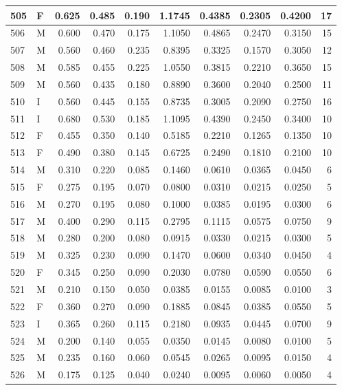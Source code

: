 \documentclass[9pt,twocolumn,twoside,]{pnas-new}
\begin{document}
\begin{tabular}{l|l|r|r|r|r|r|r|r|r}
\hline
505 & F & 0.625 & 0.485 & 0.190 & 1.1745 & 0.4385 & 0.2305 & 0.4200 & 17\\
\hline
506 & M & 0.600 & 0.470 & 0.175 & 1.1050 & 0.4865 & 0.2470 & 0.3150 & 15\\
\hline
507 & M & 0.560 & 0.460 & 0.235 & 0.8395 & 0.3325 & 0.1570 & 0.3050 & 12\\
\hline
508 & M & 0.585 & 0.455 & 0.225 & 1.0550 & 0.3815 & 0.2210 & 0.3650 & 15\\
\hline
509 & M & 0.560 & 0.435 & 0.180 & 0.8890 & 0.3600 & 0.2040 & 0.2500 & 11\\
\hline
510 & I & 0.560 & 0.445 & 0.155 & 0.8735 & 0.3005 & 0.2090 & 0.2750 & 16\\
\hline
511 & I & 0.680 & 0.530 & 0.185 & 1.1095 & 0.4390 & 0.2450 & 0.3400 & 10\\
\hline
512 & F & 0.455 & 0.350 & 0.140 & 0.5185 & 0.2210 & 0.1265 & 0.1350 & 10\\
\hline
513 & F & 0.490 & 0.380 & 0.145 & 0.6725 & 0.2490 & 0.1810 & 0.2100 & 10\\
\hline
514 & M & 0.310 & 0.220 & 0.085 & 0.1460 & 0.0610 & 0.0365 & 0.0450 & 6\\
\hline
515 & F & 0.275 & 0.195 & 0.070 & 0.0800 & 0.0310 & 0.0215 & 0.0250 & 5\\
\hline
516 & M & 0.270 & 0.195 & 0.080 & 0.1000 & 0.0385 & 0.0195 & 0.0300 & 6\\
\hline
517 & M & 0.400 & 0.290 & 0.115 & 0.2795 & 0.1115 & 0.0575 & 0.0750 & 9\\
\hline
518 & M & 0.280 & 0.200 & 0.080 & 0.0915 & 0.0330 & 0.0215 & 0.0300 & 5\\
\hline
519 & M & 0.325 & 0.230 & 0.090 & 0.1470 & 0.0600 & 0.0340 & 0.0450 & 4\\
\hline
520 & F & 0.345 & 0.250 & 0.090 & 0.2030 & 0.0780 & 0.0590 & 0.0550 & 6\\
\hline
521 & M & 0.210 & 0.150 & 0.050 & 0.0385 & 0.0155 & 0.0085 & 0.0100 & 3\\
\hline
522 & F & 0.360 & 0.270 & 0.090 & 0.1885 & 0.0845 & 0.0385 & 0.0550 & 5\\
\hline
523 & I & 0.365 & 0.260 & 0.115 & 0.2180 & 0.0935 & 0.0445 & 0.0700 & 9\\
\hline
524 & M & 0.200 & 0.140 & 0.055 & 0.0350 & 0.0145 & 0.0080 & 0.0100 & 5\\
\hline
525 & M & 0.235 & 0.160 & 0.060 & 0.0545 & 0.0265 & 0.0095 & 0.0150 & 4\\
\hline
526 & M & 0.175 & 0.125 & 0.040 & 0.0240 & 0.0095 & 0.0060 & 0.0050 & 4\\

\end{tabular}
\end{document}
